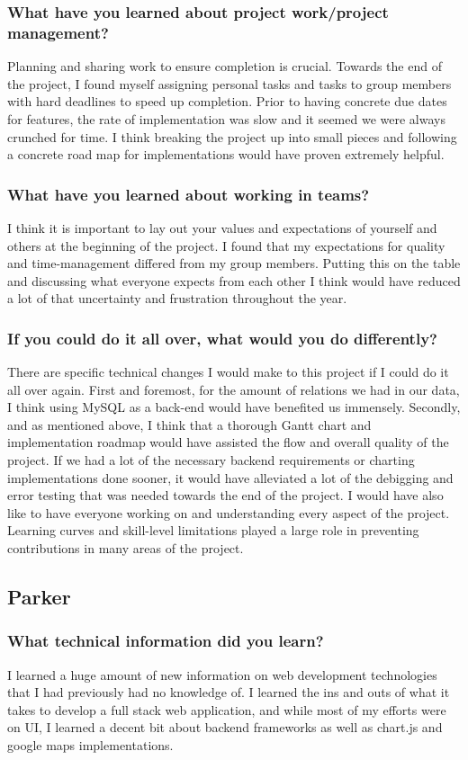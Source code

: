 \documentclass[journal,10pt,onecolumn,compsoc]{IEEEtran}
\begin{document}
    \subsubsection{What have you learned about project work/project management?}
    Planning and sharing work to ensure completion is crucial. Towards the end of the project, I found myself assigning personal tasks and tasks to group members with hard deadlines to speed up completion. Prior to having concrete due dates for features, the rate of implementation was slow and it seemed we were always crunched for time. I think breaking the project up into small pieces and following a concrete road map for implementations would have proven extremely helpful. 
    \subsubsection{What have you learned about working in teams?}
    I think it is important to lay out your values and expectations of yourself and others at the beginning of the project. I found that my expectations for quality and time-management differed from my group members. Putting this on the table and discussing what everyone expects from each other I think would have reduced a lot of that uncertainty and frustration throughout the year. 
    \subsubsection{If you could do it all over, what would you do differently?} 
    There are specific technical changes I would make to this project if I could do it all over again. First and foremost, for the amount of relations we had in our data, I think using MySQL as a back-end would have benefited us immensely. Secondly, and as mentioned above, I think that a thorough Gantt chart and implementation roadmap would have assisted the flow and overall quality of the project. If we had a lot of the necessary backend requirements or charting implementations done sooner, it would have alleviated a lot of the debigging and error testing that was needed towards the end of the project. I would have also like to have everyone working on and understanding every aspect of the project. Learning curves and skill-level limitations played a large role in preventing contributions in many areas of the project.
    \subsection{Parker}
    \subsubsection{What technical information did you learn?}  
	I learned a huge amount of new information on web development technologies that I had previously had no knowledge of. I learned the ins and outs of what it takes to develop a full stack web application, and while most of my efforts were on UI, I learned a decent bit about backend frameworks as well as chart.js and google maps implementations.
\end{document}
